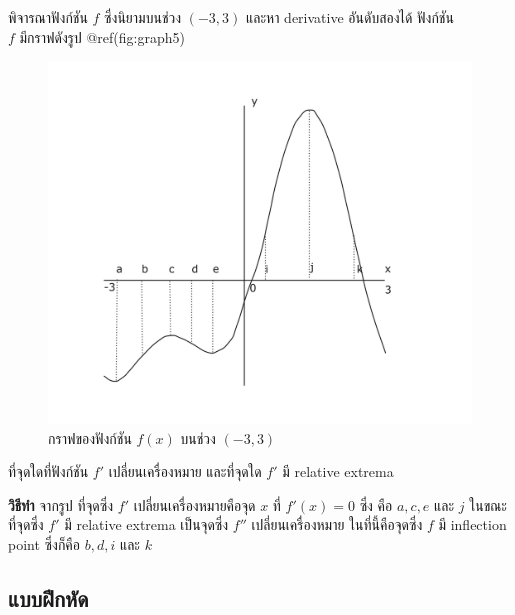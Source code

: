 \documentclass[
]{book}
\begin{document}
พิจารณาฟังก์ชัน \(f\) ซึ่งนิยามบนช่วง \((-3,3)\) และหา derivative อันดับสองได้
ฟังก์ชัน\\
\(f\) มีกราฟดังรูป @ref(fig:graph5)

\begin{figure}

{\centering \includegraphics[width=0.5\linewidth]{images/graph5} 

}

\caption{กราฟของฟังก์ชัน $f(x)$ บนช่วง $(-3,3)$}\label{fig:graph5}
\end{figure}

ที่จุดใดที่ฟังก์ชัน \(f'\) เปลี่ยนเครื่องหมาย และที่จุดใด \(f'\) มี relative extrema

\textbf{วิธีทำ} จากรูป ที่จุดซึ่ง \(f'\) เปลี่ยนเครื่องหมายคือจุด \(x\) ที่
\(f'(x) = 0\) ซึ่ง คือ \(a, c, e\) และ \(j\) ในขณะที่จุดซึ่ง \(f'\) มี relative
extrema เป็นจุดซึ่ง \(f''\) เปลี่ยนเครื่องหมาย ในที่นี้คือจุดซึ่ง \(f\) มี inflection
point ซึ่งก็คือ \(b, d, i\) และ \(k\)

\subsection{แบบฝึกหัด}\label{uxe41uxe1auxe1auxe1duxe01uxe2buxe14-4}
\end{document}
